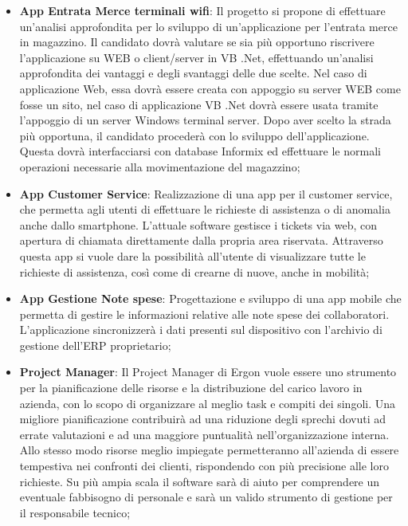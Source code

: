 \begin{itemize}
	
	\item \textbf{App Entrata Merce terminali wifi}: Il progetto si propone di effettuare un'analisi approfondita per lo sviluppo di un'applicazione per l’entrata merce in magazzino.
	Il candidato dovrà valutare se sia più opportuno riscrivere l’applicazione su WEB o
	client/server in VB .Net, effettuando un’analisi approfondita dei vantaggi e degli
	svantaggi delle due scelte.
	Nel caso di applicazione Web, essa dovrà essere creata con appoggio su server WEB
	come fosse un sito, nel caso di applicazione VB .Net dovrà essere usata tramite
	l’appoggio di un server Windows terminal server. Dopo aver scelto la strada più
	opportuna, il candidato procederà con lo sviluppo dell’applicazione. Questa dovrà
	interfacciarsi con database Informix ed effettuare le normali operazioni necessarie alla
	movimentazione del magazzino;
	
	\item \textbf{App Customer Service}: Realizzazione di una app per il customer service, che permetta agli utenti di effettuare le richieste di assistenza o di anomalia anche dallo smartphone. L’attuale software gestisce i tickets via web, con apertura di chiamata direttamente dalla propria area	riservata. Attraverso questa app si vuole dare la possibilità all’utente di visualizzare tutte le richieste di assistenza, così come di crearne di nuove, anche in mobilità;
	
	\item \textbf{App Gestione Note spese}: Progettazione e sviluppo di una app mobile che permetta di gestire le informazioni	relative alle note spese dei collaboratori. L’applicazione sincronizzerà i dati presenti sul dispositivo con l’archivio di gestione dell’ERP proprietario;
	
	\item \textbf{Project Manager}: Il Project Manager di Ergon vuole essere uno strumento per la pianificazione delle
	risorse e la distribuzione del carico lavoro in azienda, con lo scopo di organizzare al
	meglio task e compiti dei singoli.
	Una migliore pianificazione contribuirà ad una riduzione degli sprechi dovuti ad errate
	valutazioni e ad una maggiore puntualità nell’organizzazione interna. Allo stesso modo
	risorse meglio impiegate permetteranno all’azienda di essere tempestiva nei confronti
	dei clienti, rispondendo con più precisione alle loro richieste. Su più ampia scala il
	software sarà di aiuto per comprendere un eventuale fabbisogno di personale e sarà
	un valido strumento di gestione per il responsabile tecnico;
	

\end{itemize}
